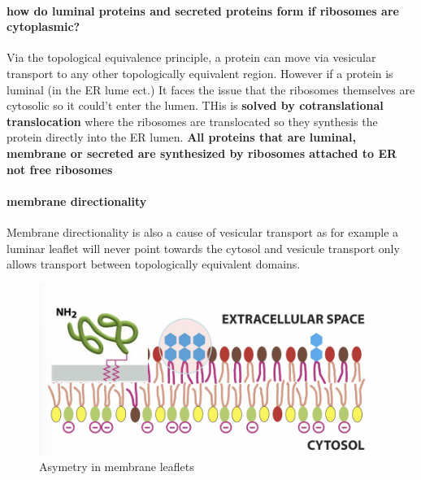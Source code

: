 \documentclass[../main.tex]{subfiles}
\begin{document}
\paragraph{how do luminal proteins and secreted proteins form if ribosomes are cytoplasmic?}
Via the topological equivalence principle, a protein can move via vesicular transport to any other topologically equivalent region. However if a protein is luminal (in the ER lume ect.) It faces the issue that the ribosomes themselves are cytosolic so it could't enter the lumen. THis is\textbf{ solved by cotranslational translocation} where the ribosomes are translocated so they synthesis the protein directly into the ER lumen. \textbf{All proteins that are luminal, membrane or secreted are synthesized by ribosomes attached to ER not free ribosomes}

\paragraph{membrane directionality}
Membrane directionality is also a cause of vesicular transport as for example a luminar leaflet will never point towards the cytosol and vesicule transport only allows transport between topologically equivalent domains. 

\begin{figure}[H]
    \centering
    \includegraphics[width=0.7\linewidth]{asymetry.png}
    \caption{Asymetry in membrane leaflets}
    \label{fig:enter-label}
\end{figure}
\end{document}
